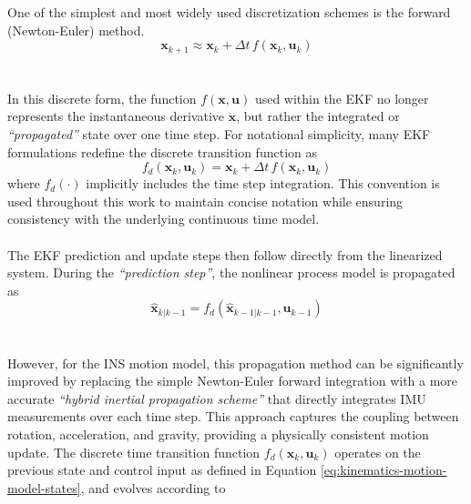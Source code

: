 One of the simplest and most widely used discretization schemes is the forward (Newton-Euler) method.
$$
    \mathbf{x}_{k+1} \approx \mathbf{x}_k + \Delta t \, f(\mathbf{x}_k, \mathbf{u}_k)
$$  
\\ \\
In this discrete form, the function $f(\mathbf{x}, \mathbf{u})$ used within the EKF no longer represents the instantaneous derivative $\dot{\mathbf{x}}$, but rather the integrated or \textit{``propagated''} state over one time step. For notational simplicity, many EKF formulations redefine the discrete transition function as
$$
    f_d(\mathbf{x}_k, \mathbf{u}_k) = \mathbf{x}_k + \Delta t \, f(\mathbf{x}_k, \mathbf{u}_k)
$$
where $f_d(\cdot)$ implicitly includes the time step integration. This convention is used throughout this work to maintain concise notation while ensuring consistency with the underlying continuous time model.
\\ \\
The EKF prediction and update steps then follow directly from the linearized system. During the \textit{``prediction step''}, the nonlinear process model is propagated as
$$
    \hat{\mathbf{x}}_{k|k-1} = f_d(\hat{\mathbf{x}}_{k-1|k-1}, \mathbf{u}_{k-1})
$$
\\ \\
However, for the INS motion model, this propagation method can be significantly improved by replacing the simple Newton-Euler forward integration with a more accurate \textit{``hybrid inertial propagation scheme''} that directly integrates IMU measurements over each time step. This approach captures the coupling between rotation, acceleration, and gravity, providing a physically consistent motion update. The discrete time transition function \( f_d(\mathbf{x}_k, \mathbf{u}_k) \) operates on the previous state and control input as defined in Equation \ref{eq:kinematics-motion-model-states}, and evolves according to
